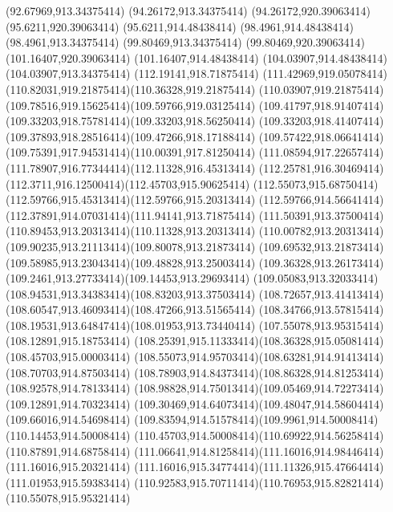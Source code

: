 {{	\lineto(92.67969,913.34375414)
	\closepath
	\moveto(94.26172,913.34375414)
	\lineto(94.26172,920.39063414)
	\lineto(95.6211,920.39063414)
	\lineto(95.6211,914.48438414)
	\lineto(98.4961,914.48438414)
	\lineto(98.4961,913.34375414)
	\closepath
	\moveto(99.80469,913.34375414)
	\lineto(99.80469,920.39063414)
	\lineto(101.16407,920.39063414)
	\lineto(101.16407,914.48438414)
	\lineto(104.03907,914.48438414)
	\lineto(104.03907,913.34375414)
	\closepath
	\moveto(112.19141,918.71875414)
	\curveto(111.42969,919.05078414)(110.82031,919.21875414)(110.36328,919.21875414)
	\curveto(110.03907,919.21875414)(109.78516,919.15625414)(109.59766,919.03125414)
	\curveto(109.41797,918.91407414)(109.33203,918.75781414)(109.33203,918.56250414)
	\curveto(109.33203,918.41407414)(109.37893,918.28516414)(109.47266,918.17188414)
	\curveto(109.57422,918.06641414)(109.75391,917.94531414)(110.00391,917.81250414)
	\curveto(111.08594,917.22657414)(111.78907,916.77344414)(112.11328,916.45313414)
	\curveto(112.25781,916.30469414)(112.3711,916.12500414)(112.45703,915.90625414)
	\curveto(112.55073,915.68750414)(112.59766,915.45313414)(112.59766,915.20313414)
	\curveto(112.59766,914.56641414)(112.37891,914.07031414)(111.94141,913.71875414)
	\curveto(111.50391,913.37500414)(110.89453,913.20313414)(110.11328,913.20313414)
	\curveto(110.00782,913.20313414)(109.90235,913.21113414)(109.80078,913.21873414)
	\curveto(109.69532,913.21873414)(109.58985,913.23043414)(109.48828,913.25003414)
	\curveto(109.36328,913.26173414)(109.2461,913.27733414)(109.14453,913.29693414)
	\curveto(109.05083,913.32033414)(108.94531,913.34383414)(108.83203,913.37503414)
	\curveto(108.72657,913.41413414)(108.60547,913.46093414)(108.47266,913.51565414)
	\curveto(108.34766,913.57815414)(108.19531,913.64847414)(108.01953,913.73440414)
	\lineto(107.55078,913.95315414)
	\lineto(108.12891,915.18753414)
	\curveto(108.25391,915.11333414)(108.36328,915.05081414)(108.45703,915.00003414)
	\curveto(108.55073,914.95703414)(108.63281,914.91413414)(108.70703,914.87503414)
	\curveto(108.78903,914.84373414)(108.86328,914.81253414)(108.92578,914.78133414)
	\curveto(108.98828,914.75013414)(109.05469,914.72273414)(109.12891,914.70323414)
	\curveto(109.30469,914.64073414)(109.48047,914.58604414)(109.66016,914.54698414)
	\curveto(109.83594,914.51578414)(109.9961,914.50008414)(110.14453,914.50008414)
	\curveto(110.45703,914.50008414)(110.69922,914.56258414)(110.87891,914.68758414)
	\curveto(111.06641,914.81258414)(111.16016,914.98446414)(111.16016,915.20321414)
	\curveto(111.16016,915.34774414)(111.11326,915.47664414)(111.01953,915.59383414)
	\curveto(110.92583,915.70711414)(110.76953,915.82821414)(110.55078,915.95321414)
}}
